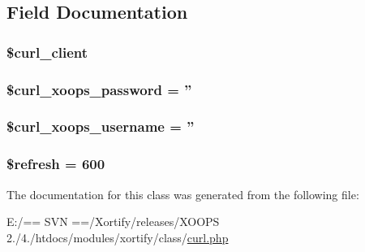 \subsection{Field Documentation}
\hypertarget{class_c_u_r_l_xortify_exchange_a402f2112991f3227835af80e9df33e38}{
\subsubsection[{\$curl\-\_\-client}]{\setlength{\rightskip}{0pt plus 5cm}\$curl\-\_\-client}}\label{class_c_u_r_l_xortify_exchange_a402f2112991f3227835af80e9df33e38}
\hypertarget{class_c_u_r_l_xortify_exchange_a6c9851541ed3826c67cfe7224c38f0b8}{
\subsubsection[{\$curl\-\_\-xoops\-\_\-password}]{\setlength{\rightskip}{0pt plus 5cm}\$curl\-\_\-xoops\-\_\-password = ''}}\label{class_c_u_r_l_xortify_exchange_a6c9851541ed3826c67cfe7224c38f0b8}
\hypertarget{class_c_u_r_l_xortify_exchange_aab7480ba9f878a02b2c9fd43922fa070}{
\subsubsection[{\$curl\-\_\-xoops\-\_\-username}]{\setlength{\rightskip}{0pt plus 5cm}\$curl\-\_\-xoops\-\_\-username = ''}}\label{class_c_u_r_l_xortify_exchange_aab7480ba9f878a02b2c9fd43922fa070}
\hypertarget{class_c_u_r_l_xortify_exchange_a8527f826b6959aaa92b0e51ee427ba1a}{
\subsubsection[{\$refresh}]{\setlength{\rightskip}{0pt plus 5cm}\$refresh = 600}}\label{class_c_u_r_l_xortify_exchange_a8527f826b6959aaa92b0e51ee427ba1a}


The documentation for this class was generated from the following file\-:\begin{DoxyCompactItemize}
\item 
E\-:/== S\-V\-N ==/\-Xortify/releases/\-X\-O\-O\-P\-S 2./4./htdocs/modules/xortify/class/\hyperlink{curl_8php}{curl.\-php}\end{DoxyCompactItemize}
